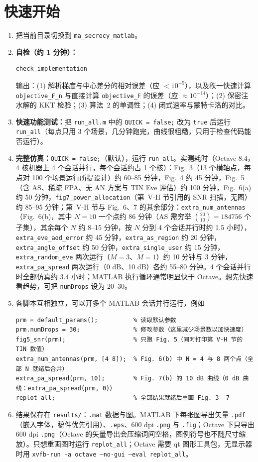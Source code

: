 \documentclass[11pt,a4paper]{ctexart}
\newcommand{\code}[1]{\texttt{#1}}
\begin{document}
\section{快速开始}
\begin{enumerate}
\item 把当前目录切换到 \code{ma\_secrecy\_matlab}。
\item \textbf{自检（约 1 分钟）：}
\begin{lstlisting}
check_implementation
\end{lstlisting}
输出：(1) 解析梯度与中心差分的相对误差（应 $<10^{-5}$），以及秩一快速计算 \code{objective\_F\_n} 与直接计算 \code{objective\_F} 的误差（应 $\approx10^{-14}$）；(2) 保密注水解的 KKT 检验；(3) 算法~2 的单调性；(4) 闭式速率与蒙特卡洛的对比。
\item \textbf{快速功能测试：}把 \code{run\_all.m} 中的 \code{QUICK = false;} 改为 \code{true} 后运行 \code{run\_all}（每点只用 3 个场景，几分钟跑完，曲线很粗糙，只用于检查代码能否运行）。
\item \textbf{完整仿真：}\code{QUICK = false;}（默认），运行 \code{run\_all}。实测耗时（Octave 8.4，4 核机器上 4 个会话并行，每个会话约占 1 个核）：Fig.~3（13 个横轴点，每点对 100 个场景运行所提设计）约 60--85 分钟，Fig.~4 约 45 分钟，Fig.~5（含 AS、稀疏 FPA、无 AN 方案与 TIN Eve 评估）约 100 分钟，Fig.~6(a) 约 50 分钟，\code{fig7\_power\_allocation}（第~V-H 节引用的 SNR 扫描，无图）约 85--95 分钟；第~V-H 节与 Fig.~6、7 的其余部分：\code{extra\_num\_antennas}（Fig.~6(b)，其中 $N=10$ 一个点约 86 分钟（AS 需穷举 $\binom{20}{10}=184756$ 个子集），其余每个 $N$ 约 8--15 分钟，按 $N$ 分到 4 个会话并行时约 1.5 小时），\code{extra\_eve\_aod\_error} 约 45 分钟，\code{extra\_as\_region} 约 20 分钟，\code{extra\_angle\_offset} 约 50 分钟，\code{extra\_single\_user} 约 15 分钟，\code{extra\_random\_eve} 两次运行（$M=3$、$M=1$）约 10 分钟与 3 分钟，\code{extra\_pa\_spread} 两次运行（0 dB、10 dB）各约 55--80 分钟。4 个会话并行时全部仿真约 3.4 小时；MATLAB 执行循环通常明显快于 Octave。想先快速看趋势，可把 \code{numDrops} 设为 20--30。
\item 各脚本互相独立，可以开多个 MATLAB 会话并行运行，例如
\begin{lstlisting}
prm = default_params();          % 读取默认参数
prm.numDrops = 30;               % 修改参数（这里减少场景数以加快速度）
fig5_snr(prm);                   % 只跑 Fig. 5（同时打印第 V-H 节的 TIN 数值）
extra_num_antennas(prm, [4 8]);  % Fig. 6(b) 中 N = 4 与 8 两个点（全部 N 就绪后合并）
extra_pa_spread(prm, 10);        % Fig. 7(b) 的 10 dB 曲线（0 dB 曲线：extra_pa_spread(prm, 0)）
replot_all;                      % 全部结果就绪后重画 Fig. 3--7
\end{lstlisting}
\item 结果保存在 \code{results/}：\code{.mat} 数据与图。MATLAB 下每张图导出矢量 \code{.pdf}（嵌入字体，稿件优先引用）、\code{.eps}、600 dpi \code{.png} 与 \code{.fig}；Octave 下只导出 600 dpi \code{.png}（Octave 的矢量导出会压缩词间空格，图例符号也不随尺寸缩放）。只想重画图时运行 \code{replot\_all}；Octave 需要 qt 图形工具包，无显示器时用 \code{xvfb-run -a octave --no-gui --eval replot\_all}。
\end{enumerate}
\end{document}
